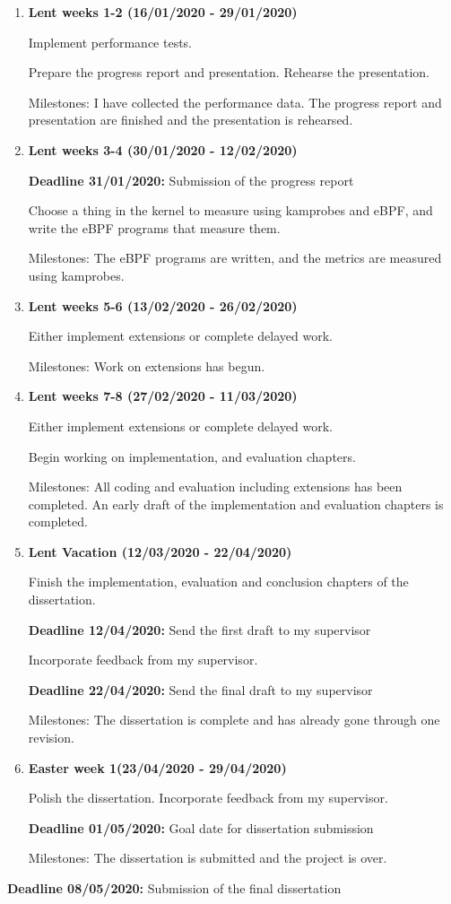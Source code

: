 \begin{enumerate}
        \item {\bf Lent weeks 1-2 (16/01/2020 - 29/01/2020)} 

            Implement performance tests.

            Prepare the progress report and presentation. Rehearse the presentation.

            Milestones: I have collected the performance data.
            The progress report and presentation are finished and the presentation is rehearsed.

        \item {\bf Lent weeks 3-4 (30/01/2020 - 12/02/2020)} 

            {\bf Deadline 31/01/2020:} Submission of the progress report 
            
            Choose a thing in the kernel to measure using kamprobes and eBPF,
            and write the eBPF programs that measure them.

            Milestones: The eBPF programs are written, and the metrics are measured using kamprobes.

        \item {\bf Lent weeks 5-6 (13/02/2020 - 26/02/2020)} 

            Either implement extensions or complete delayed work.

            Milestones: Work on extensions has begun.

        \item {\bf Lent weeks 7-8 (27/02/2020 - 11/03/2020)}

            Either implement extensions or complete delayed work.
            
            Begin working on implementation, and evaluation chapters.

            Milestones: All coding and evaluation including extensions has been completed. An early draft
            of the implementation and evaluation chapters is completed.

        \item {\bf Lent Vacation (12/03/2020 - 22/04/2020)}

            Finish the implementation, evaluation and conclusion chapters of the dissertation.

            {\bf Deadline 12/04/2020:} Send the first draft to my supervisor

            Incorporate feedback from my supervisor.

            {\bf Deadline 22/04/2020:} Send the final draft to my supervisor

            Milestones: The dissertation is complete and has already gone through one revision.

        \item {\bf Easter week 1(23/04/2020 - 29/04/2020)} 

            Polish the dissertation. Incorporate feedback from my supervisor.

            {\bf Deadline 01/05/2020:} Goal date for dissertation submission

            Milestones: The dissertation is submitted and the project is over.

    \end{enumerate}
    {\bf Deadline 08/05/2020:} Submission of the final dissertation
